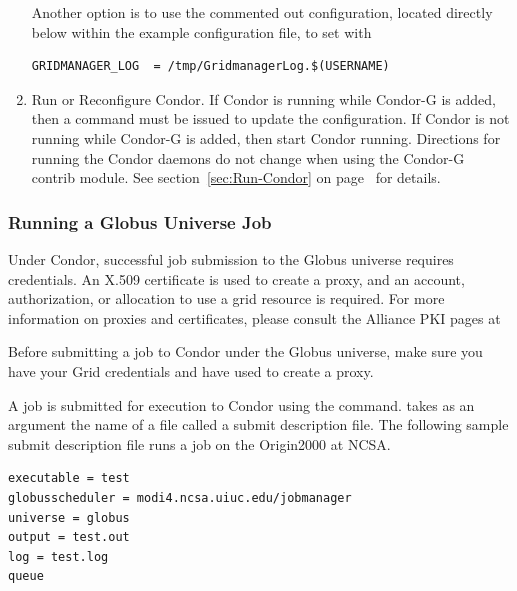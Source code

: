 \begin{enumerate}
Another option is to use the commented out configuration, located
directly below within the example configuration file,
to set  with
\begin{verbatim}
GRIDMANAGER_LOG  = /tmp/GridmanagerLog.$(USERNAME)
\end{verbatim}

\item{Run or Reconfigure Condor.}
If Condor is running while Condor-G is added, then a
 command must be issued to update
the configuration.
If Condor is not running while Condor-G is added, then 
start Condor running.
Directions for running the Condor daemons do not change when using
the Condor-G contrib module.
See section~\ref{sec:Run-Condor} on page~\pageref{sec:Run-Condor}
for details.
\end{enumerate}

\subsubsection{\label{sec:Running-CondorG-Job}Running a Globus Universe Job}

Under Condor, successful job submission to the Globus universe requires
credentials.
An X.509 certificate is used to create a proxy,
and an account, authorization, or allocation to use a grid resource
is required.
For more information on proxies and certificates,
please consult the Alliance PKI pages at 


Before submitting a job to Condor under the Globus universe,
make sure you have your Grid 
credentials and have used  to create a proxy.

A job is submitted for execution to Condor using the
 command.
 takes as an argument
the name of a file called a submit description file.
The following sample submit description file runs a job on
the Origin2000 at NCSA.

\begin{verbatim}
executable = test
globusscheduler = modi4.ncsa.uiuc.edu/jobmanager
universe = globus
output = test.out
log = test.log
queue
\end{verbatim} 


